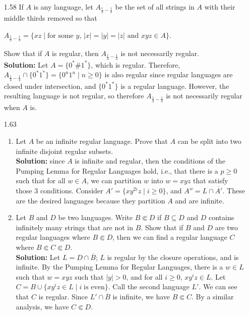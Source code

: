 \begin{enumerate}
\item[1.58]If $A$ is any language, let $A_{\frac{1}{3} - \frac{1}{3}}$ be the set of all strings in $A$ with their middle thirds removed so that
\begin{center}
$A_{\frac{1}{3} - \frac{1}{3}} = \{xz\;\vert\;\text{for some $y$, $|x| = |y| = |z|$ and $xyz \in A$}\}$.
\end{center}
Show that if $A$ is regular, then $A_{\frac{1}{3} - \frac{1}{3}}$ is not necessarily regular.
\\
\textbf{Solution:} Let $A = \{0^*\#1^*\}$, which is regular. Therefore, $A_{\frac{1}{3} - \frac{1}{3}} \cap \{0^*1^*\} = \{0^n1^n\;|\;n \ge 0\}$ is also regular since regular languages are closed under intersection, and $\{0^*1^*\}$ is a regular language. However, the resulting language is not regular, so therefore $A_{\frac{1}{3} - \frac{1}{3}}$ is not necessarily regular when $A$ is.

\item[1.63]
\begin{enumerate}
\item Let $A$ be an infinite regular language. Prove that $A$ can be split into two infinite disjoint regular subsets.
\\
\textbf{Solution:} since $A$ is infinite and regular, then the conditions of the Pumping Lemma for Regular Languages hold, i.e., that there is a $p \ge 0$ such that for all $w \in A$, we can partition $w$ into $w = xyz$ that satisfy those 3 conditions. Consider $A' = \{xy^{2i}z\;\vert\;i \ge 0\}$, and $A'' = L \cap \overline{A'}$. These are the desired languages because they partition $A$ and are infinite. 

\item Let $B$ and $D$ be two languages. Write $B \Subset D$ if $B \subseteq D$ and $D$ contains infinitely many strings that are not in $B$. Show that if $B$ and $D$ are two regular languages where $B \Subset D$, then we can find a regular language $C$ where $B \Subset C \Subset D$.
\\
\textbf{Solution:} Let $L = D \cap \overline{B}$; $L$ is regular by the closure operations, and is infinite. By the Pumping Lemma for Regular Languages, there is a $w \in L$ such that $w = xyz$ such that $|y| > 0$, and for all $i \ge 0$, $xy^i z \in L$. Let $C = B \cup \{xy^i z \in L\;\vert\;i\;\text{is even}\}$. Call the second language $L'$. We can see that $C$ is regular. Since $L' \cap \overline{B}$ is infinite, we have $B \Subset C$. By a similar analysis, we have $C \Subset D$.
\end{enumerate}


\end{enumerate}
